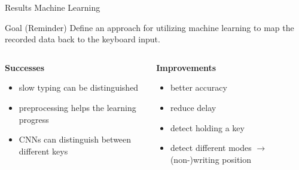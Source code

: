 \begin{frame}{Results Machine Learning}
    \begin{block}{Goal (Reminder)}
        Define an approach for utilizing machine learning to map the recorded
        data back to the keyboard input.
    \end{block}
    \pause
    \vfill\null
    \begin{columns}[T]
        \begin{column}{0.5\textwidth}
            \textbf{Successes}
            \begin{itemize}
                \item slow typing can be distinguished
                \item preprocessing helps the learning progress
                \item CNNs can distinguish between different keys
            \end{itemize}
        \end{column}
        \begin{column}{0.5\textwidth}
            \textbf{Improvements}
            \begin{itemize}
                \item better accuracy
                \item reduce delay
                \item detect holding a key
                \item detect different modes $\rightarrow$(non-)writing position
            \end{itemize}
        \end{column}
    \end{columns}

\end{frame}
